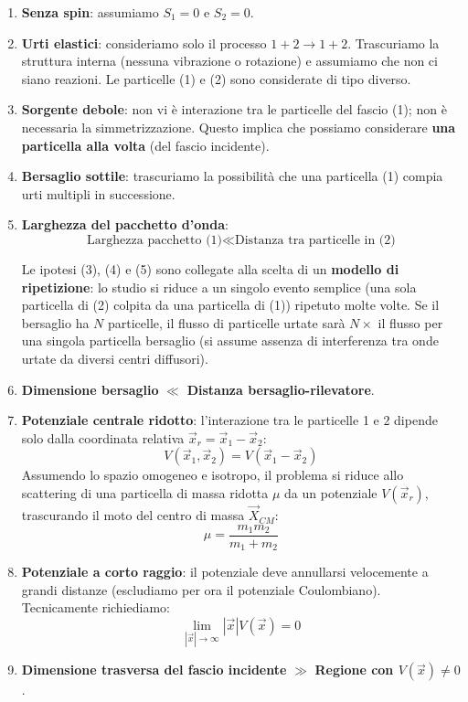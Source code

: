 \begin{enumerate}
    \item \textbf{Senza spin}: assumiamo \( S_1 = 0 \) e \( S_2 = 0 \).
    \item \textbf{Urti elastici}: consideriamo solo il processo \( 1 + 2 \longrightarrow 1 + 2 \). Trascuriamo la struttura interna (nessuna vibrazione o rotazione) e assumiamo che non ci siano reazioni. Le particelle (1) e (2) sono considerate di tipo diverso.
    \item \textbf{Sorgente debole}: non vi è interazione tra le particelle del fascio (1); non è necessaria la simmetrizzazione. Questo implica che possiamo considerare \textbf{una particella alla volta} (del fascio incidente).
    \item \textbf{Bersaglio sottile}: trascuriamo la possibilità che una particella (1) compia urti multipli in successione.
    \item \textbf{Larghezza del pacchetto d'onda}:
    \[
        \text{Larghezza pacchetto (1)} \ll \text{Distanza tra particelle in (2)}
    \]
    \begin{remark}
        Le ipotesi (3), (4) e (5) sono collegate alla scelta di un \textbf{modello di ripetizione}: lo studio si riduce a un singolo evento semplice (una sola particella di (2) colpita da una particella di (1)) ripetuto molte volte. Se il bersaglio ha \( N \) particelle, il flusso di particelle urtate sarà \( N \times \) il flusso per una singola particella bersaglio (si assume assenza di interferenza tra onde urtate da diversi centri diffusori).
    \end{remark}
    
    \item \textbf{Dimensione bersaglio} \( \ll \) \textbf{Distanza bersaglio-rilevatore}.
    \item \textbf{Potenziale centrale ridotto}: l'interazione tra le particelle 1 e 2 dipende solo dalla coordinata relativa \( \vec{x}_r = \vec{x}_1 - \vec{x}_2 \):
    \[
        V(\vec{x}_1, \vec{x}_2) = V(\vec{x}_1 - \vec{x}_2)
    \]
    Assumendo lo spazio omogeneo e isotropo, il problema si riduce allo scattering di una particella di massa ridotta \( \mu \) da un potenziale \( V(\vec{x}_r) \), trascurando il moto del centro di massa \( \vec{X}_{CM} \):
    \[
        \mu = \frac{m_1 m_2}{m_1 + m_2}
    \]
    \item \textbf{Potenziale a corto raggio}: il potenziale deve annullarsi velocemente a grandi distanze (escludiamo per ora il potenziale Coulombiano). Tecnicamente richiediamo:
    \[
        \lim_{|\vec{x}| \to \infty} |\vec{x}| V(\vec{x}) = 0
    \]
    \item \textbf{Dimensione trasversa del fascio incidente} \( \gg \) \textbf{Regione con \( V(\vec{x}) \neq 0 \)}.
\end{enumerate}

